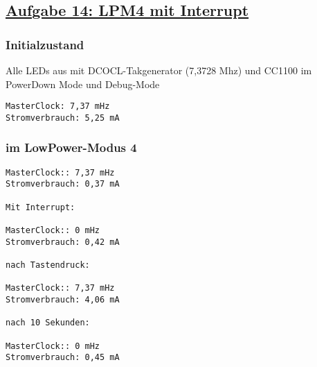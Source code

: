 \subsection*
{\href{http://cst.mi.fu-berlin.de/intern/19606-P-MPP/Aufgaben/040501.html}
{Aufgabe 14: LPM4 mit Interrupt}}

\subsubsection{Initialzustand}
Alle LEDs aus mit DCOCL-Takgenerator (7,3728 Mhz) und CC1100 im PowerDown Mode und Debug-Mode

\begin{verbatim}MasterClock: 7,37 mHz
Stromverbrauch: 5,25 mA\end{verbatim}

\subsubsection{im LowPower-Modus 4}
\begin{verbatim}MasterClock:: 7,37 mHz
Stromverbrauch: 0,37 mA

Mit Interrupt:

MasterClock:: 0 mHz
Stromverbrauch: 0,42 mA

nach Tastendruck:

MasterClock:: 7,37 mHz
Stromverbrauch: 4,06 mA

nach 10 Sekunden:

MasterClock:: 0 mHz
Stromverbrauch: 0,45 mA\end{verbatim}


